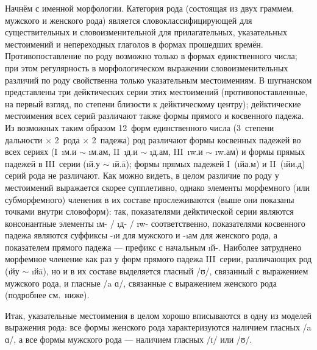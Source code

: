 Начнём с именной морфологии. Категория рода (состоящая из двух граммем, мужского и женского рода) является словоклассифицирующей для существительных и словоизменительной для прилагательных, указательных местоимений и непереходных глаголов в формах прошедших времён. Противопоставление по роду возможно только в формах единственного числа; при этом регулярность в морфологическом выражении словоизменительных различий по роду свойственна только указательным местоимениям. В шугнанском представлены три дейктических серии этих местоимений (противопоставленные, на первый взгляд, по степени близости к дейктическому центру); дейктические местоимения всех серий различают также формы прямого и косвенного падежа. Из возможных таким образом 12~форм единственного числа (3~степени дальности × 2~рода × 2~падежа) род различают формы косвенных падежей во всех сериях (I~\i{м.и} $\sim$ \i{м.ам}, II~\i{д.и} $\sim$ \i{д.ам}, III~\i{w.и} $\sim$ \i{w.ам}) и формы прямых падежей в III~серии (\i{й.у} $\sim$ \i{й.ā}); формы прямых падежей I~(\i{йа.м}) и II~(\i{йи.д}) серий рода не различают. Как можно видеть, в целом различие по роду у местоимений выражается скорее супплетивно, однако элементы морфемного (или субморфемного) членения в их составе прослеживаются (выше они показаны точками внутри словоформ): так, показателями дейктической серии являются консонантные элементы \i{м}- / \i{д}- / \i{w}- соответственно, показателями косвенного падежа являются суффиксы -\i{и} для мужского и -\i{ам} для женского рода, а показателем прямого падежа — префикс с начальным \i{й}-. Наиболее затруднено морфемное членение как раз у форм прямого падежа III~серии, различающих род (\i{йу} $\sim$ \i{йā}), но и в их составе выделяется гласный /ʊ/, связанный с выражением мужского рода, и гласные /a ɑ/, связанные с выражением женского рода (подробнее см.~ниже). 

Итак, указательные местоимения в целом хорошо вписываются в одну из моделей выражения рода: все формы женского рода характеризуются наличием гласных /a ɑ/, а все формы мужского рода — наличием гласных /ɪ/ или /ʊ/.

